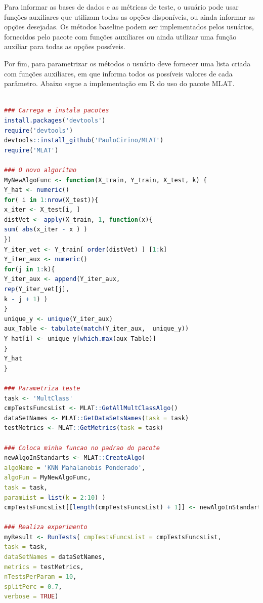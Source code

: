 Para informar as bases de dados e as métricas de teste, o usuário pode usar funções auxiliares que utilizam todas as opções disponíveis, ou ainda informar as opções desejadas. Os métodos baseline podem ser implementados pelos usuários, fornecidos pelo pacote com funções auxiliares ou ainda utilizar uma função auxiliar para todas as opções possíveis. 

Por fim, para parametrizar os métodos o usuário deve fornecer uma lista criada com funções auxiliares, em que informa todos os possíveis valores de cada parâmetro. Abaixo segue a implementação em R do uso do pacote MLAT.

\begin{lstlisting}[language=R]

### Carrega e instala pacotes
install.packages('devtools')
require('devtools')
devtools::install_github('PauloCirino/MLAT')
require('MLAT')

### O novo algoritmo
MyNewAlgoFunc <- function(X_train, Y_train, X_test, k) {
Y_hat <- numeric()
for( i in 1:nrow(X_test)){
x_iter <- X_test[i, ]
distVet <- apply(X_train, 1, function(x){
sum( abs(x_iter - x ) )
})
Y_iter_vet <- Y_train[ order(distVet) ] [1:k]
Y_iter_aux <- numeric()
for(j in 1:k){
Y_iter_aux <- append(Y_iter_aux,
rep(Y_iter_vet[j],
k - j + 1) )
}
unique_y <- unique(Y_iter_aux)
aux_Table <- tabulate(match(Y_iter_aux,  unique_y))
Y_hat[i] <- unique_y[which.max(aux_Table)]
}
Y_hat
}

### Parametriza teste
task <- 'MultClass'
cmpTestsFuncsList <- MLAT::GetAllMultClassAlgo()
dataSetNames <- MLAT::GetDataSetsNames(task = task)
testMetrics <- MLAT::GetMetrics(task = task)

### Coloca minha funcao no padrao do pacote
newAlgoInStandarts <- MLAT::CreateAlgo(  
algoName = 'KNN Mahalanobis Ponderado', 
algoFun = MyNewAlgoFunc, 
task = task, 
paramList = list(k = 2:10) )
cmpTestsFuncsList[[length(cmpTestsFuncsList) + 1]] <- newAlgoInStandarts

### Realiza experimento
myResult <- RunTests( cmpTestsFuncsList = cmpTestsFuncsList,
task = task,
dataSetNames = dataSetNames,
metrics = testMetrics,
nTestsPerParam = 10,
splitPerc = 0.7, 
verbose = TRUE)

\end{lstlisting}


